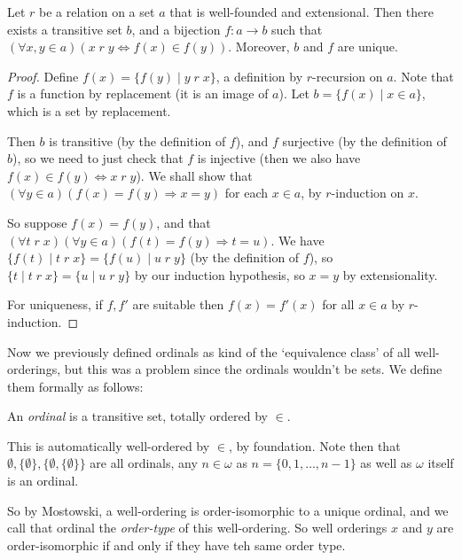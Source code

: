 \documentclass[a3paper, 10pt]{article}
\renewcommand{\vocab}[1]{\emph{#1}}
\begin{document}
\begin{multicols*}{5}
\begin{theorem}
  Let $r$ be a relation on a set $a$ that is well-founded and extensional. Then there exists a transitive set $b$, and a bijection $f: a \rightarrow b$ such that $(\forall x, y \in a)(x\; r\; y \Leftrightarrow f(x) \in f(y))$. Moreover, $b$ and $f$ are unique.
\end{theorem}
\begin{proof}
  Define $f(x) = \{f(y) \mid y\; r\; x\}$, a definition by $r$-recursion on $a$. Note that $f$ is a function by replacement (it is an image of $a$). Let $b = \{f(x) \mid x \in a\}$, which is a set by replacement.

  Then $b$ is transitive (by the definition of $f$), and $f$ surjective (by the definition of $b$), so we need to just check that $f$ is injective (then we also have $f(x) \in f(y) \Leftrightarrow x\;r\;y$). We shall show that $(\forall y \in a)(f(x) = f(y) \Rightarrow x = y)$ for each $x \in a$, by $r$-induction on $x$.

  So suppose $f(x) = f(y)$, and that $(\forall t\;r\;x)(\forall y \in a)(f(t) = f(y) \Rightarrow t = u)$. 
  We have $\{f(t) \mid t\;r\;x\} = \{f(u) \mid u\;r\;y\}$ (by the definition of $f$), so $\{t \mid t\;r\;x\} = \{u \mid u\;r\;y\}$ by our induction hypothesis, so $x = y$ by extensionality.

  For uniqueness, if $f, f'$ are suitable then $f(x) = f'(x)$ for all $x \in a$ by $r$-induction.
\end{proof}

Now we previously defined ordinals as kind of the `equivalence class' of all well-orderings, but this was a problem since the ordinals wouldn't be sets. We define them formally as follows:

\begin{definition}[Ordinal]
  An \vocab{ordinal} is a transitive set, totally ordered by $\in$.
\end{definition}

This is automatically well-ordered by $\in$, by foundation. Note then that $\emptyset, \{\emptyset\}, \{\emptyset,\{\emptyset\}\}$ are all ordinals, any $n \in \omega$ as $n = \{0, 1, \dots, n - 1\}$ as well as $\omega$ itself is an ordinal.
  
So by Mostowski, a well-ordering is order-isomorphic to a unique ordinal, and we call that ordinal the \vocab{order-type} of this well-ordering. So well orderings $x$ and $y$ are order-isomorphic if and only if they have teh same order type.


\end{multicols*}
\end{document}
